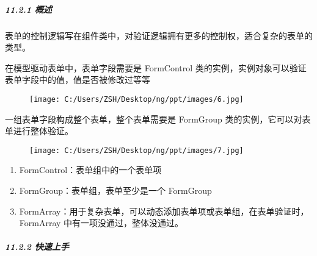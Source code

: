 \documentclass[
]{article}
\begin{document}
\hypertarget{1121-ux6982ux8ff0}{%
\subparagraph{11.2.1 概述}\label{1121-ux6982ux8ff0}}

表单的控制逻辑写在组件类中，对验证逻辑拥有更多的控制权，适合复杂的表单的类型。

在模型驱动表单中，表单字段需要是 FormControl
类的实例，实例对象可以验证表单字段中的值，值是否被修改过等等

\begin{figure}
\centering
\texttt{[image: C:/Users/ZSH/Desktop/ng/ppt/images/6.jpg]}
\caption{}
\end{figure}

一组表单字段构成整个表单，整个表单需要是 FormGroup
类的实例，它可以对表单进行整体验证。

\begin{figure}
\centering
\texttt{[image: C:/Users/ZSH/Desktop/ng/ppt/images/7.jpg]}
\caption{}
\end{figure}

\begin{enumerate}
\def\labelenumi{\arabic{enumi}.}
\item
  FormControl：表单组中的一个表单项
\item
  FormGroup：表单组，表单至少是一个 FormGroup
\item
  FormArray：用于复杂表单，可以动态添加表单项或表单组，在表单验证时，FormArray
  中有一项没通过，整体没通过。
\end{enumerate}

\hypertarget{1122-ux5febux901fux4e0aux624b}{%
\subparagraph{11.2.2 快速上手}\label{1122-ux5febux901fux4e0aux624b}}
\end{document}
